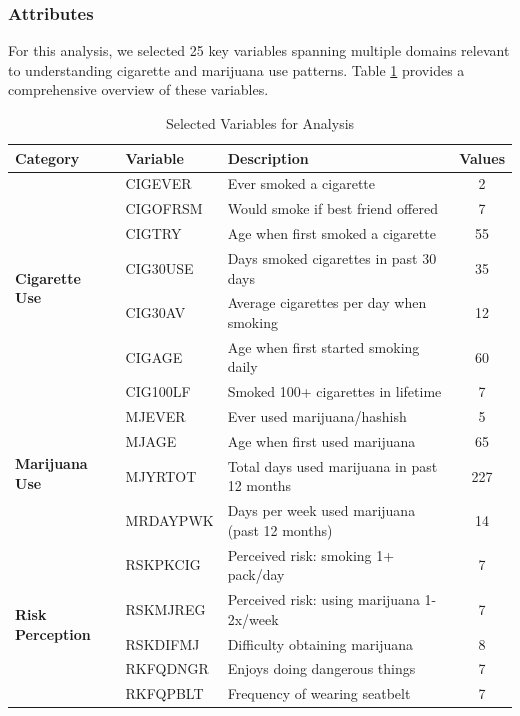 \documentclass[conference]{IEEEtran}
\begin{document}
\subsubsection{Attributes}

For this analysis, we selected 25 key variables spanning multiple domains relevant to understanding cigarette and marijuana use patterns. Table \ref{tab:variables} provides a comprehensive overview of these variables.

\begin{table}[t]
\centering
\caption{Selected Variables for Analysis}
\label{tab:variables}
\small
\begin{tabular}{@{}llp{7.5cm}c@{}}
\toprule
\textbf{Category} & \textbf{Variable} & \textbf{Description} & \textbf{Values} \\ \midrule
\multirow{7}{*}{\textbf{Cigarette Use}} 
& CIGEVER & Ever smoked a cigarette & 2 \\
& CIGOFRSM & Would smoke if best friend offered & 7 \\
& CIGTRY & Age when first smoked a cigarette & 55 \\
& CIG30USE & Days smoked cigarettes in past 30 days & 35 \\
& CIG30AV & Average cigarettes per day when smoking & 12 \\
& CIGAGE & Age when first started smoking daily & 60 \\
& CIG100LF & Smoked 100+ cigarettes in lifetime & 7 \\ \midrule

\multirow{4}{*}{\textbf{Marijuana Use}}
& MJEVER & Ever used marijuana/hashish & 5 \\
& MJAGE & Age when first used marijuana & 65 \\
& MJYRTOT & Total days used marijuana in past 12 months & 227 \\
& MRDAYPWK & Days per week used marijuana (past 12 months) & 14 \\ \midrule

\multirow{5}{*}{\textbf{Risk Perception}}
& RSKPKCIG & Perceived risk: smoking 1+ pack/day & 7 \\
& RSKMJREG & Perceived risk: using marijuana 1-2x/week & 7 \\
& RSKDIFMJ & Difficulty obtaining marijuana & 8 \\
& RKFQDNGR & Enjoys doing dangerous things & 7 \\
& RKFQPBLT & Frequency of wearing seatbelt & 7 \\ \midrule


\end{tabular}
\end{table}
\end{document}
